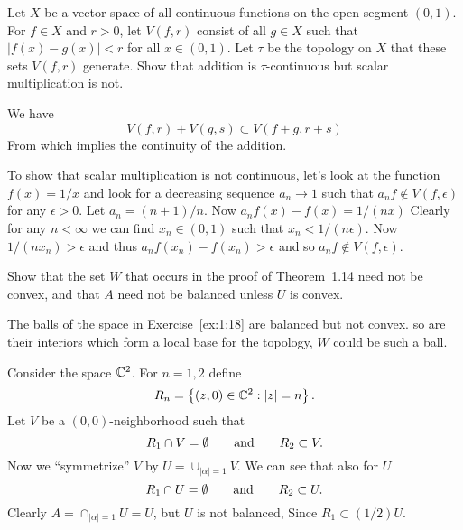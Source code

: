 \begin{enumerate}
\begin{excopy}
Let $X$ be a vector space of all continuous functions on the open segment
\((0,1)\). For 
\(f\in X\) and \(r>0\), let \(V(f,r)\) consist of all \(g\in X\) such that
\(|f(x)-g(x)|<r\) for all \(x\in(0,1)\).
Let \(\tau\) be the topology on $X$ that these sets \(V(f,r)\) generate.
Show that addition is \(\tau\)-continuous but scalar multiplication is not.
\end{excopy}

We have 
\begin{equation*}
V(f,r) + V(g,s) \subset V(f+g,r+s)
\end{equation*}
From which implies the continuity of the addition.

To show that scalar multiplication is not continuous, let's look
at the function \(f(x) = 1/x\) and look for a decreasing sequence
\(a_n \rightarrow 1\) such that \(a_n f \notin V(f,\epsilon)\) for any 
\(\epsilon > 0\).
Let \(a_n = (n+1)/n\). Now \(a_nf(x)-f(x) = 1/(nx)\)
Clearly for any \(n<\infty\) we can find \(x_n\in(0,1)\)
such that 
\(x_n < 1/(n\epsilon)\). Now 
\(1/(nx_n) > \epsilon\) and thus \(a_nf(x_n)-f(x_n) > \epsilon\)
and so \(a_nf \notin V(f,\epsilon)\).


\begin{excopy}
Show that the set $W$ that occurs in the proof of Theorem~1.14 need
not be convex, and that $A$ need not be balanced unless $U$ is convex.
\end{excopy}


The balls of the space in Exercise~\ref{ex:1:18} are balanced
but not convex. so are their interiors which form 
a local base for the topology, $W$ could be such a ball.

Consider the space \(\mathbb{C}^2\).
For \(n=1,2\) define
\begin{equation*}
 R_n = \left\{(z,0) \in \mathbb{C}^2: |z| = n\right\}.
\end{equation*}
Let $V$ be a \((0,0)\)-neighborhood such that
\begin{equation*}
 R_1 \cap V = \emptyset \qquad \textnormal{and} \qquad R_2 \subset V.
\end{equation*}
Now we ``symmetrize'' $V$ by \(U = \cup_{|\alpha|=1} V\).
We can see that also for $U$
\begin{equation*}
 R_1 \cap U = \emptyset \qquad \textnormal{and} \qquad R_2 \subset U.
\end{equation*}
Clearly \(A=\cap_{|\alpha|=1} U = U\), but $U$ is not balanced,
Since \(R_1 \subset (1/2)U\).

\end{enumerate}
